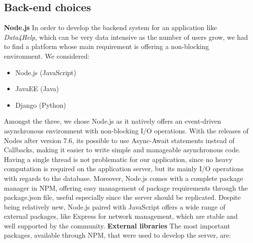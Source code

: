 \documentclass[titlepage]{article}
\begin{document}
	\subsection{Back-end choices}
	{\bf Node.js} \newline
	In order to develop the backend system for an application like {\it Data4Help}, which can be very data intensive as the number of users grow, we had to find a platform whose main requirement is offering a non-blocking environment. We considered:
	\begin{itemize}
		\item {Node.js (JavaScript)}
		\item{JavaEE (Java)}
		\item{Django (Python)}
	\end{itemize}
	Amongst the three, we chose Node.js as it natively offers an event-driven asynchronous environment with non-blocking I/O operations. With the releases of Nodes after version 7.6, it\textsc{}s possible to use Async-Await statements instead of Callbacks, making it easier to write simple and manageable asynchronous code.
	\newline
	\newline
	\noindent
	Having a single thread is not problematic for our application, since no heavy computation is required on the application server, but it\textsc{}s mainly I/O operations with regards to the database.
	\newline
	\newline
	\noindent
	Moreover, Node.js comes with a complete package manager in NPM, offering easy management of package requirements through the package.json file, useful especially since the server should be replicated. Despite being relatively new, Node.js paired with JavaScript offers a wide range of external packages, like Express for network management, which are stable and well supported by the community. 
	\newline
	\newline
	\noindent
	{\bf External libraries} \newline
	The most important packages, available through NPM, that were used to develop the server, are:
\end{document}
